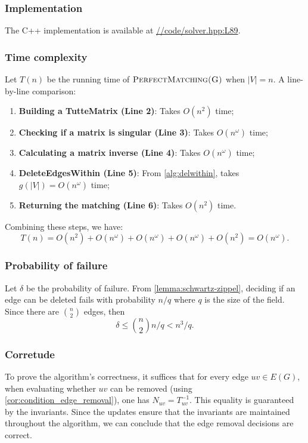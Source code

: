 \subsubsection{Implementation}
\noindent
The C++ implementation is available at 
\href{https://github.com/antoniomsah/algebraic-max-matching/blob/main/code/solver.hpp#L89}{//code/solver.hpp:L89}.

\subsubsection{Time complexity}
\noindent
Let \(T(n)\) be the running time of \(\textsc{PerfectMatching(G)}\) when \(|V| = n\). 
A line-by-line comparison:
\begin{enumerate}
  \item \textbf{Building a TutteMatrix (Line 2)}: Takes \(O(n^2)\) time;
  \item \textbf{Checking if a matrix is singular (Line 3)}: Takes \(O(n^\omega)\) time;
  \item \textbf{Calculating a matrix inverse (Line 4)}: Takes \(O(n^\omega)\) time;
  \item \textbf{DeleteEdgesWithin (Line 5)}: From \cref{alg:delwithin}, takes \(g(|V|) = O(n^\omega)\) time;
  \item \textbf{Returning the matching (Line 6)}: Takes \(O(n^2)\) time.
\end{enumerate}
Combining these steps, we have:
\begin{equation}
\label{alg:harvey_complexity}
    T(n) = O(n^2) + O(n^\omega) + O(n^\omega) + O(n^\omega) + O(n^2) = O(n^\omega).
\end{equation}

\subsubsection{Probability of failure}
\noindent
Let \(\delta\) be the probability of failure.
From \cref{lemma:schwartz-zippel}, deciding if an edge can be deleted fails with probability \(n / q\) where \(q\) is the size of the field. 
Since there are \(\binom{n}{2}\) edges, then 
\[
  \delta \leq \binom{n}{2} n / q < n^3 / q.
\]

\subsubsection{Corretude}
\noindent
To prove the algorithm's correctness, it suffices that for every edge \(uv \in E(G)\), when evaluating whether \(uv\) can be removed (using \cref{cor:condition_edge_removal}), one has \(N_{uv} = T^{-1}_{uv}\).
This equality is guaranteed by the invariants.
Since the updates ensure that the invariants are maintained throughout the algorithm, we can conclude that the edge removal decisions are correct.

